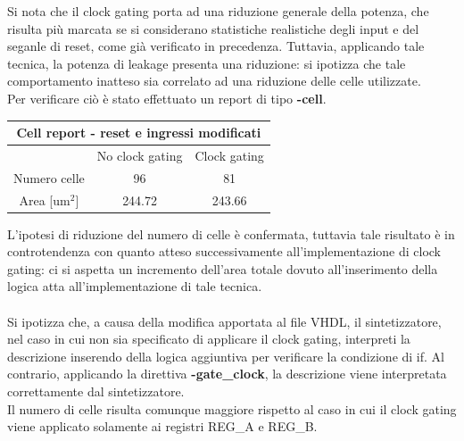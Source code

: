\documentclass[11pt,  english, makeidx, a4paper, titlepage, oneside]{book}
\begin{document}
\vspace{0.3cm}          
Si nota che il clock gating porta ad una riduzione generale della potenza, che risulta più marcata se si considerano statistiche realistiche degli input e del seganle di reset, come già verificato in precedenza. Tuttavia, applicando tale tecnica, la potenza di leakage presenta una riduzione: si ipotizza che tale comportamento inatteso sia correlato ad una riduzione delle celle utilizzate.
\\
Per verificare ciò è stato effettuato un report di tipo \textbf{-cell}.
\\
\begin{center}
	\begin{tabular}{|c|c|c|}
	\hline
	\multicolumn{3}{|c|}{Cell report - reset e ingressi modificati}\\
	\hline
	& No clock gating & Clock gating \\
	\hline
	Numero celle & 96 & 81 \\
	\hline
	 Area [um$^2$] & 244.72 & 243.66 \\
	\hline
	\end{tabular}	
\end{center}
\vspace{0.3cm} 
 L'ipotesi di riduzione del numero di celle è confermata, tuttavia tale risultato è in controtendenza con quanto atteso successivamente all'implementazione di clock gating: ci si aspetta un incremento dell'area totale dovuto all'inserimento della logica atta all'implementazione di tale tecnica.
 \\\\
Si ipotizza che, a causa della modifica apportata al file VHDL, il sintetizzatore, nel caso in cui non sia specificato di applicare il clock gating, interpreti la descrizione inserendo della logica aggiuntiva per verificare la condizione di if. Al contrario, applicando la direttiva \textbf{-gate\_clock}, la descrizione viene interpretata correttamente dal sintetizzatore.
\\
Il numero di celle risulta comunque maggiore rispetto al caso in cui il clock gating viene applicato solamente ai registri REG\_A e REG\_B.
\newpage
\end{document}
